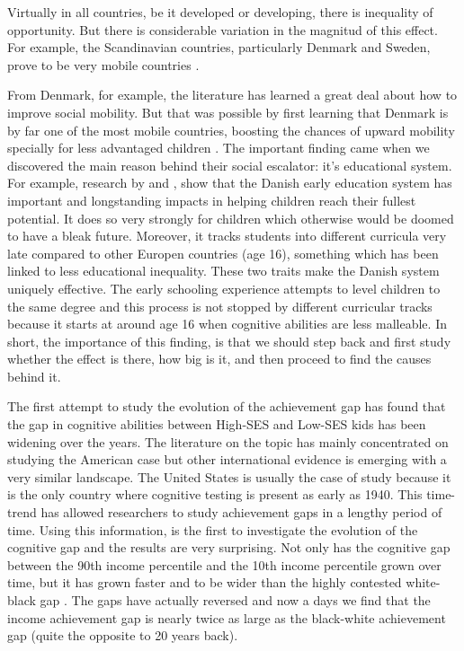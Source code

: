 \documentclass[11pt, a4paper]{article}\usepackage[]{graphicx}\usepackage[]{color}
\begin{document}
Virtually in all countries, be it developed or developing, there is inequality of opportunity. But there is considerable variation in the magnitud of this effect. For example, the Scandinavian countries, particularly Denmark and Sweden, prove to be very mobile countries \citep{esping2012, breen2007, shavit1993}.

From Denmark, for example, the literature has learned a great deal about how to improve social mobility. But that was possible by first learning that Denmark is by far one of the most mobile countries, boosting the chances of upward mobility specially for less advantaged children \citep{bjorklund2009, jaeger2007}. The important finding came when we discovered the main reason behind their social escalator: it's educational system. For example, research by \citet{esping_waldfogel2012} and \citet{bauchmuller2014}, show that the Danish early education system has important and longstanding impacts in helping children reach their fullest potential. It does so very strongly for children which otherwise would be doomed to have a bleak future. Moreover, it tracks students into different curricula very late compared to other Europen countries (age 16), something which has been linked to less educational inequality. These two traits make the Danish system uniquely effective. The early schooling experience attempts to level children to the same degree and this process is not stopped by different curricular tracks because it starts at around age 16 when cognitive abilities are less malleable. In short, the importance of this finding, is that we should step back and first study whether the effect is there, how big is it, and then proceed to find the causes behind it.

The first attempt to study the evolution of the achievement gap has found that the gap in cognitive abilities between High-SES and Low-SES kids has been widening over the years. The literature on the topic has mainly concentrated on studying the American case \citep{reardon2011} but other international evidence is emerging with a very similar landscape. The United States is usually the case of study because it is the only country where cognitive testing is present as early as 1940. This time-trend has allowed researchers to study achievement gaps in a lengthy period of time. Using this information, \citet{reardon2011} is the first to investigate the evolution of the cognitive gap and the results are very surprising. Not only has the cognitive gap between the 90th income percentile and the 10th income percentile grown over time, but it has grown faster and to be wider than the highly contested white-black gap \citep{magnuson2008}. The gaps have actually reversed and now a days we find that the income achievement gap is nearly twice as large as the black-white achievement gap (quite the opposite to 20 years back).
\end{document}

